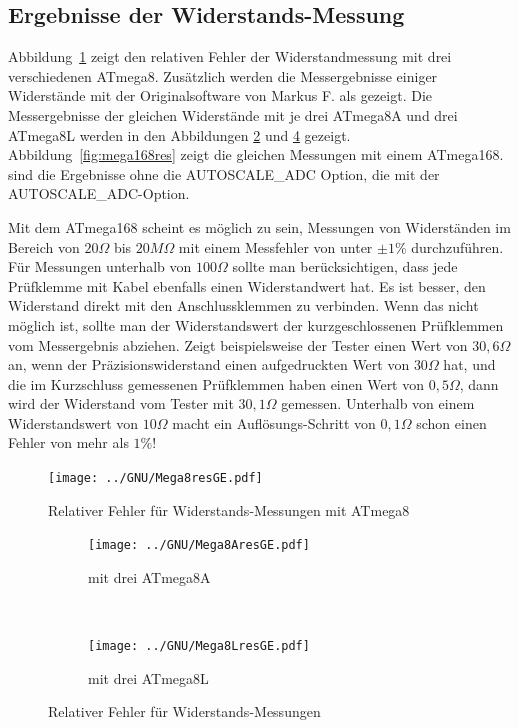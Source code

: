 \subsection{Ergebnisse der Widerstands-Messung}
Abbildung~\ref{fig:mega8res} zeigt den relativen Fehler der Widerstandmessung mit drei verschiedenen ATmega8. 
Zusätzlich werden die Messergebnisse einiger Widerstände mit der Originalsoftware von Markus F. als
 gezeigt.
Die Messergebnisse der gleichen Widerstände mit je drei ATmega8A und drei ATmega8L werden in den Abbildungen
\ref{fig:mega8Ares} und \ref{fig:mega8Lres} gezeigt.
Abbildung~\ref{fig:mega168res} zeigt die gleichen Messungen mit einem ATmega168.
 sind die Ergebnisse ohne die AUTOSCALE\_ADC Option,  die mit der
 AUTOSCALE\_ADC-Option.

Mit dem ATmega168 scheint es möglich zu sein, Messungen von Widerständen im
Bereich von \(20\Omega\) bis \(20M\Omega\) mit einem Messfehler von unter \(\pm1\%\) durchzuführen.
Für Messungen unterhalb von \(100\Omega\) sollte man berücksichtigen, dass jede Prüfklemme mit Kabel ebenfalls
einen Widerstandwert hat.
Es ist besser, den Widerstand direkt mit den Anschlussklemmen zu verbinden.
Wenn das nicht möglich ist, sollte man der Widerstandswert der kurzgeschlossenen Prüfklemmen vom Messergebnis abziehen.
Zeigt beispielsweise der Tester einen Wert von \(30,6\Omega\) an, wenn der Präzisionswiderstand einen aufgedruckten Wert von \(30\Omega\) hat, 
und die im Kurzschluss gemessenen Prüfklemmen haben einen Wert von \(0,5\Omega\), dann wird der Widerstand vom
Tester mit \(30,1\Omega\) gemessen.
Unterhalb von einem Widerstandswert von \(10\Omega\) macht ein Auflösungs-Schritt von \(0,1\Omega\) schon einen Fehler von mehr als \(1\%\)!

\begin{figure}[H]
\centering
\texttt{[image: ../GNU/Mega8resGE.pdf]}
\caption{Relativer Fehler für Widerstands-Messungen mit ATmega8 }
\label{fig:mega8res}
\end{figure}

\begin{figure}[H]
  \begin{subfigure}[b]{.5\textwidth}
    \centering
    \texttt{[image: ../GNU/Mega8AresGE.pdf]}
    \caption{mit drei ATmega8A}
    \label{fig:mega8Ares}
  \end{subfigure}
  ~
  \begin{subfigure}[b]{.5\textwidth}
    \centering
    \texttt{[image: ../GNU/Mega8LresGE.pdf]}
    \caption{mit drei ATmega8L}
    \label{fig:mega8Lres}
  \end{subfigure}
\caption{Relativer Fehler für Widerstands-Messungen}
\end{figure}

